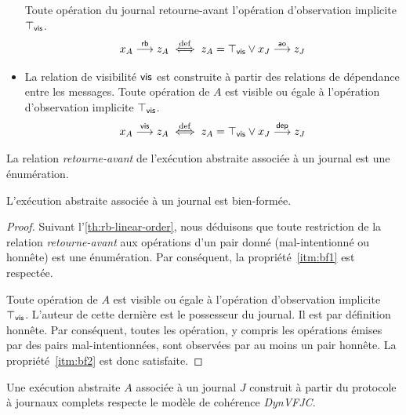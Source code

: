 \begin{definition}
\begin{itemize}
Toute opération du journal retourne-avant l'opération d'observation implicite $\top_{\operatorname{\mathsf{vis}}}$.
\begin{equation*}
    x_A \overset{\mathsf{rb}}{\longrightarrow} z_A \overset{\mathrm{def}}{\iff} z_A = \top_{\operatorname{\mathsf{vis}}} \lor x_J \overset{\mathsf{ao}}{\longrightarrow} z_J
\end{equation*}
\item La relation de visibilité $\operatorname{\mathsf{vis}}$ est construite à partir des relations de dépendance entre les messages.
Toute opération de $A$ est visible ou égale à l'opération d'observation implicite $\top_{\operatorname{\mathsf{vis}}}$.
\begin{equation*}
    x_A \overset{\mathsf{vis}}{\longrightarrow} z_A \overset{\mathrm{def}}{\iff} z_A = \top_{\operatorname{\mathsf{vis}}} \lor x_J \overset{\mathsf{dep}}{\longrightarrow} z_J
\end{equation*}
\end{itemize}
\end{definition}


\begin{claim}\label{th:rb-linear-order}
La relation \emph{retourne-avant} de l'exécution abstraite associée à un journal est une énumération.
\end{claim}

\begin{proposition}
L'exécution abstraite associée à un journal est bien-formée.
\end{proposition}

\begin{proof}
Suivant l'\autoref{th:rb-linear-order}, nous déduisons que toute restriction de la relation \emph{retourne-avant} aux opérations d'un pair donné (mal-intentionné ou honnête) est une énumération.
Par conséquent, la propriété~\ref{itm:bf1} est respectée.

Toute opération de $A$ est visible ou égale à l'opération d'observation implicite $\top_{\operatorname{\mathsf{vis}}}$.
L'auteur de cette dernière est le possesseur du journal.
Il est par définition honnête.
Par conséquent, toutes les opération, y compris les opérations émises par des pairs mal-intentionnées, sont observées par au moins un pair honnête.
La propriété~\ref{itm:bf2} est donc satisfaite.
\end{proof}

\begin{theorem}
Une exécution abstraite $A$ associée à un journal $J$ construit à partir du protocole à journaux complets respecte le modèle de cohérence \emph{DynVFJC}.
\end{theorem}

